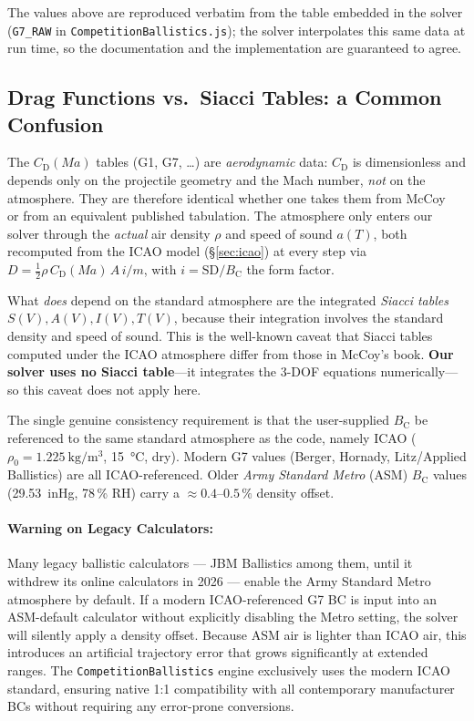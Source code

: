 \documentclass[11pt,twoside,openright]{report}
\newcommand{\Cd}{C_{\mathrm{D}}}
\newcommand{\Bc}{B_{\mathrm{C}}}
\newcommand{\Mach}{\mathit{Ma}}
\newcommand{\sd}{\mathrm{SD}}
\begin{document}
The values above are reproduced verbatim from the table embedded in the solver
(\texttt{G7\_RAW} in \texttt{CompetitionBallistics.js}); the solver interpolates
this same data at run time, so the documentation and the implementation are
guaranteed to agree.

\subsection{Drag Functions vs.\ Siacci Tables: a Common Confusion}

\noindent
The $\Cd(\Mach)$ tables (G1, G7, \dots) are \emph{aerodynamic} data: $\Cd$ is
dimensionless and depends only on the projectile geometry and the Mach number,
\emph{not} on the atmosphere. They are therefore identical whether one takes them
from McCoy~\citep{mccoy1999modern} or from an equivalent published tabulation. The
atmosphere only enters our solver through the \emph{actual} air density $\rho$ and
speed of sound $a(T)$, both recomputed from the ICAO model
(\S\ref{sec:icao}) at every step via
$D = \tfrac{1}{2}\rho\,\Cd(\Mach)\,A\,i/m$, with $i = \sd/\Bc$ the form factor.

What \emph{does} depend on the standard atmosphere are the integrated
\emph{Siacci tables} $S(V), A(V), I(V), T(V)$, because their integration
involves the standard density and speed of sound. This is the well-known caveat
that Siacci tables computed under the ICAO atmosphere differ from those in
McCoy's book. \textbf{Our solver uses no Siacci table}---it integrates the 3-DOF
equations numerically---so this caveat does not apply here.

The single genuine consistency requirement is that the user-supplied $\Bc$ be
referenced to the same standard atmosphere as the code, namely ICAO
($\rho_0 = \SI{1.225}{\kilogram\per\meter\cubed}$, \SI{15}{\celsius}, dry).
Modern G7 values (Berger, Hornady, Litz/Applied Ballistics) are all
ICAO-referenced. Older \emph{Army Standard Metro} (ASM) $\Bc$ values
(\SI{29.53}{inHg}, 78\,\% RH) carry a $\approx 0.4$--$0.5\,\%$ density offset.

\paragraph{Warning on Legacy Calculators:} Many legacy ballistic calculators --- JBM Ballistics among them, until it withdrew its online calculators in 2026 --- enable the Army Standard Metro atmosphere by default. If a modern ICAO-referenced G7 BC is input into an ASM-default calculator without explicitly disabling the Metro setting, the solver will silently apply a density offset. Because ASM air is lighter than ICAO air, this introduces an artificial trajectory error that grows significantly at extended ranges. The \texttt{CompetitionBallistics} engine exclusively uses the modern ICAO standard, ensuring native 1:1 compatibility with all contemporary manufacturer BCs without requiring any error-prone conversions.
\end{document}

